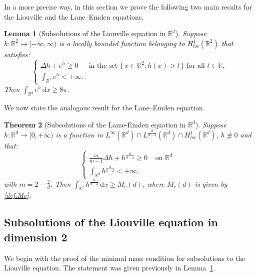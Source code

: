 \documentclass[11pt,a4paper]{article}
\numberwithin{equation}{section}
\newcommand{\R}{{\mathbb{R}}}
\theoremstyle{plain}
\newtheorem{theorem}{Theorem}[section]
\newtheorem{lemma}[theorem]{Lemma}
\theoremstyle{remark}
\newcommand {\f}{\frac}
\begin{document}
In a more precise way, in this section we prove the following two main results for the Liouville and the Lane--Emden equations. 

\begin{lemma}[Subsolutions of the Liouville equation in $\mathbb{R}^2$]
\label{lem:subsolution_liouville}
Suppose $h\colon \mathbb{R}^2 \to [-\infty,\infty)$ is a locally bounded function belonging to $H^{1}_{loc}(\R^2)$ that satisfies:
\[
\begin{cases}
\displaystyle
\Delta h + e^h  \ge  0
&\text{in the set }\{\,x\in \R^2 : h(x) > t\,\}\text{ for all }t\in\R,\\[5pt]
\displaystyle
\int_{\mathbb{R}^2} e^h < +\infty.
\end{cases}
\]
Then $\int_{\mathbb{R}^2} e^h \,\mathrm{d}x \ge 8\pi.$
\end{lemma}
 We now state the analogous result for the Lane--Emden equation.

\begin{theorem}[Subsolutions of the Lame-Emden equation in $\mathbb{R}^d$]
\label{lem:subsolution_lane-emden}
Suppose $h\colon \mathbb{R}^d \to [0,+\infty)$ is a function in $L^{\infty}(\R^d)\cap L^{\f{d}{d-2}}(\R^d)\cap H^{1}_{loc}(\R^d)$, $h\not\equiv 0$ and that:
\[
\begin{cases}
\displaystyle
\f{m}{m-1}\Delta h + h^{\f{d}{d-2}}  \ge  0
&\text{ on $\R^d$ }\\[5pt]
\displaystyle
\int_{\mathbb{R}^2} h^{\f{d}{d-2}} < +\infty,
\end{cases}
\]
with $m=2-\f{2}{d}$. Then $\int_{\mathbb{R}^2} h^{\f{d}{d-2}} \,\mathrm{d}x \ge M_c(d)$, where $M_c (d)$ is given by \eqref{def:Mc}.
\end{theorem}


\subsection{Subsolutions of the Liouville equation in dimension 2}\label{sec:Liouville d 2}

We begin with the proof of the minimal mass condition for subsolutions to the Liouville equation. The statement was given previously in Lemma~\ref{lem:subsolution_liouville}. 
\end{document}
